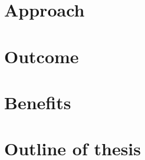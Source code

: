 \documentclass[a4paper,12pt]{report}
\begin{document}
\section{Approach}

\section{Outcome}

\section{Benefits}

\section{Outline of thesis}





% 
% 	
% 	
	
\end{document}
